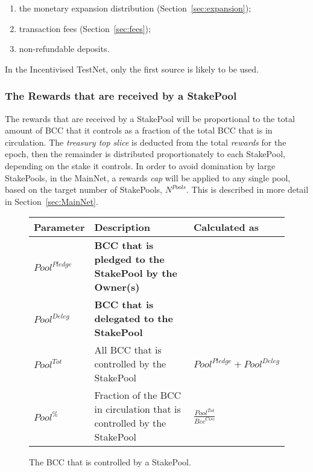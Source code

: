 \documentclass[11pt,a4paper,dvipsnames,twosided,final]{article}
\newcommand{\bcc}{BCC{}}
\newcommand{\bcc}[1]{Bcc}
\begin{document}
\begin{enumerate}
\item
  the monetary expansion distribution (Section~\ref{sec:expansion});
\item
  transaction fees (Section~\ref{sec:fees});
\item
  non-refundable deposits.
\end{enumerate}

\noindent
In the Incentivised TestNet, only the first source is likely to be used.

\subsubsection*{The Rewards that are received by a StakePool}

The rewards that are received by a StakePool will be proportional to the total amount of \bcc{} that it controls
as a fraction of the total \bcc{} that is in circulation.  The \emph{treasury top slice} is deducted from the total \emph{rewards}
for the epoch, then the remainder is distributed proportionately to each StakePool, depending on the stake it controls.  In order to avoid domination by large StakePools,
in the MainNet, a rewards \emph{cap} will be applied to any single pool, based on the target number of StakePools, $N^{\textit{Pools}}$.
This is described in more detail in Section~\ref{sec:MainNet}.

\clearpage
\begin{figure}[h!]
\begin{center}
\begin{tabular}{||l|p{9cm}|l||}
  \hline \hline
\textbf{Parameter} & \textbf{Description} & \textbf{Calculated as} \\\hline
\textbf{\color{red} ${\textit{Pool}}^\textit{Pledge}$} & \textbf{\color{red} \bcc{} that is pledged to the StakePool by the Owner(s)} & \\\hline
\textbf{\color{blue} ${\textit{Pool}}^\textit{Deleg}$} & \textbf{\color{blue}  \bcc{} that is delegated to the StakePool} & \\\hline
${\textit{Pool}}^{Tot}$ & All \bcc{} that is controlled by the StakePool & ${\textit{Pool}}^\textit{Pledge} + {\textit{Pool}}^\textit{Deleg}$ \\\hline
${\textit{Pool}}^\%$ & Fraction of the \bcc{} in circulation that is controlled by the StakePool & {\large $\frac{{\textit{Pool}}^{Tot}}{\textit{Bcc}^{\textit{Circ}}}$} \\\hline
  \hline
\end{tabular}
\end{center}
\caption{The \bcc{} that is controlled by a StakePool.}
\end{figure}
\end{document}

